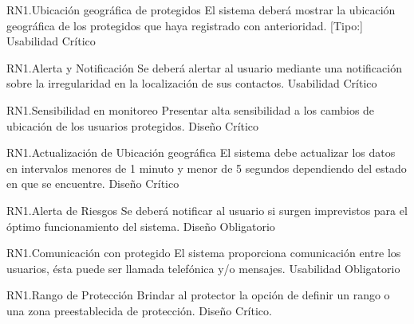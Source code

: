 \begin{BussinesRule}{RN1.}{Ubicación geográfica de protegidos}
	\BRitem[Descripción:] El sistema deberá mostrar la ubicación geográfica de los protegidos que haya registrado con anterioridad.
	[Tipo:] Usabilidad
	\BRitem[Nivel:] Crítico
\end{BussinesRule}

\begin{BussinesRule}{RN1.}{Alerta y Notificación}
	\BRitem[Descripción:] Se deberá alertar al usuario mediante una notificación sobre la irregularidad en la localización de sus contactos.
	\BRitem[Tipo:] Usabilidad
	\BRitem[Nivel:] Crítico
\end{BussinesRule}

	
\begin{BussinesRule}{RN1.}{Sensibilidad en monitoreo}
	\BRitem[Descripción:] Presentar alta sensibilidad a los cambios de ubicación de los usuarios protegidos.
	\BRitem[Tipo:] Diseño
	\BRitem[Nivel:] Crítico
\end{BussinesRule}

	
\begin{BussinesRule}{RN1.}{Actualización de Ubicación geográfica}
	\BRitem[Descripción:] El sistema debe actualizar los datos en intervalos menores de 1 minuto y menor de 5 segundos dependiendo del estado en que se encuentre.
	\BRitem[Tipo:] Diseño
	\BRitem[Nivel:] Crítico
\end{BussinesRule}

	
\begin{BussinesRule}{RN1.}{Alerta de Riesgos}
	\BRitem[Descripción:] Se deberá notificar al usuario si surgen imprevistos para el óptimo funcionamiento del sistema.
	\BRitem[Tipo:] Diseño
	\BRitem[Nivel:] Obligatorio
\end{BussinesRule}

	
\begin{BussinesRule}{RN1.}{Comunicación con protegido}
	\BRitem[Descripción:] El sistema proporciona comunicación entre los usuarios, ésta puede ser llamada telefónica y/o mensajes.
	\BRitem[Tipo:] Usabilidad
	\BRitem[Nivel:] Obligatorio
\end{BussinesRule}

	
\begin{BussinesRule}{RN1.}{Rango de Protección}
	\BRitem[Descripción:] Brindar al protector la opción de definir un rango o una zona preestablecida de protección.
	\BRitem[Tipo:] Diseño
	\BRitem[Nivel:] Crítico.
\end{BussinesRule}

